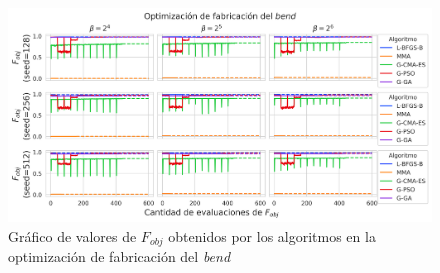 \begin{landscape}
\begin{figure}[ht]
  \centering
  \includegraphics[scale=1.0]{image/results/bend/bend-opt-fab.png}
  \caption{Gráfico de valores de $F_{obj}$ obtenidos por los algoritmos en la optimización de fabricación del \emph{bend}}
  \label{fig:bend-fab}
\end{figure}
\end{landscape}


